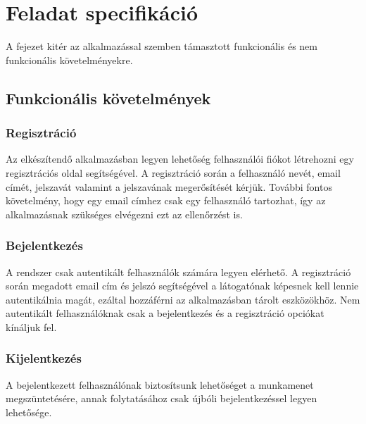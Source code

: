 \chapter{Feladat specifikáció}

A fejezet kitér az alkalmazással szemben támasztott funkcionális és nem funkcionális követelményekre.

\section{Funkcionális követelmények}

\subsection{Regisztráció}
Az elkészítendő alkalmazásban legyen lehetőség felhasználói fiókot létrehozni egy regisztrációs oldal segítségével.
A regisztráció során a felhasználó nevét, email címét, jelszavát valamint a jelszavának megerősítését kérjük.
További fontos követelmény, hogy egy email címhez csak egy felhasználó tartozhat, így az alkalmazásnak szükséges elvégezni ezt az ellenőrzést is.

\subsection{Bejelentkezés}
A rendszer csak autentikált felhasználók számára legyen elérhető.
A regisztráció során megadott email cím és jelszó segítségével a látogatónak képesnek kell lennie autentikálnia magát, ezáltal hozzáférni az alkalmazásban tárolt eszközökhöz.
Nem autentikált felhasználóknak csak a bejelentkezés és a regisztráció opciókat kínáljuk fel.

\subsection{Kijelentkezés}
A bejelentkezett felhasználónak biztosítsunk lehetőséget a munkamenet megszüntetésére, annak folytatásához csak újbóli bejelentkezéssel legyen lehetősége.

